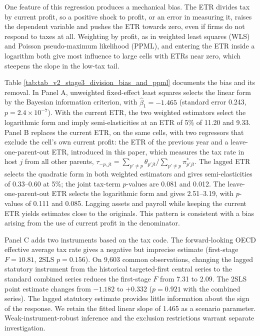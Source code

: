 \documentclass[11pt,a4paper]{article}
\begin{document}
One feature of this regression produces a mechanical bias. The ETR divides tax by current profit, so a positive shock to profit, or an error in measuring it, raises the dependent variable and pushes the ETR towards zero, even if firms do not respond to taxes at all. Weighting by profit, as in weighted least squares (WLS) and Poisson pseudo-maximum likelihood (PPML), and entering the ETR inside a logarithm both give most influence to large cells with ETRs near zero, which steepens the slope in the low-tax tail.



Table \ref{tab:tab_v2_stage3_division_bias_and_ppml} documents the bias and its removal. In Panel A, unweighted fixed-effect least squares selects the linear form by the Bayesian information criterion, with $\hat\beta_1=-1.465$ (standard error 0.243, $p=2.4\times10^{-7}$). With the current ETR, the two weighted estimators select the logarithmic form and imply semi-elasticities at an ETR of 5\% of 11.20 and 9.33. Panel B replaces the current ETR, on the same cells, with two regressors that exclude the cell's own current profit: the ETR of the previous year and a leave-one-parent-out ETR, introduced in this paper, which measures the tax rate in host $j$ from all other parents, $\tau_{-p,jt}=\sum_{p'\neq p}\theta_{p'jt}/\sum_{p'\neq p}\pi^{*}_{p'jt}$. The lagged ETR selects the quadratic form in both weighted estimators and gives semi-elasticities of 0.33–0.60 at 5\%; the joint tax-term $p$-values are 0.081 and 0.012. The leave-one-parent-out ETR selects the logarithmic form and gives 2.51–3.19, with $p$-values of 0.111 and 0.085. Lagging assets and payroll while keeping the current ETR yields estimates close to the originals. This pattern is consistent with a bias arising from the use of current profit in the denominator.

Panel C adds two instruments based on the tax code. The forward-looking OECD effective average tax rate gives a negative but imprecise estimate (first-stage $F=10.81$, 2SLS $p=0.156$). On 9,603 common observations, changing the lagged statutory instrument from the historical targeted-first central series to the standard combined series reduces the first-stage $F$ from 7.31 to 2.09. The 2SLS point estimate changes from $-1.182$ to $+0.332$ ($p=0.921$ with the combined series). The lagged statutory estimate provides little information about the sign of the response. We retain the fitted linear slope of 1.465 as a scenario parameter. Weak-instrument-robust inference and the exclusion restrictions warrant separate investigation.
\end{document}

